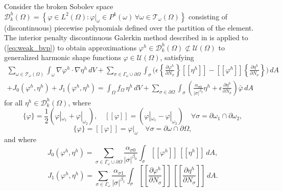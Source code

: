 	Consider the broken Sobolev space $\mathcal{D}^h_k (\Omega) = \left\{ \varphi \in L^2 (\Omega) : \varphi|_{\omega} \in P^k (\omega) \, \forall \omega \in \mathcal{T}_\omega (\Omega) \right\}$ consisting of (discontinuous) piecewise polynomials defined over the partition of the element. The interior penalty discontinuous Galerkin method described in \cite{Riviere:08} is applied to (\ref{eq:weak_bvp}) to obtain approximations $\varphi^h \in \mathcal{D}^h_k (\Omega) \not\subset \mathcal{U} (\Omega)$ to generalized harmonic shape functions $\varphi \in \mathcal{U} (\Omega)$, satisfying
	\begin{eqnarray}
		\sum_{\omega \in \mathcal{T}_\omega (\Omega)} \int_{\omega} \nabla \varphi^h \cdot \nabla \eta^h \, dV + \sum_{\sigma \in \Gamma_\omega \cup \partial \Omega} \int_{\sigma} \bigg( \epsilon \left\{ \frac{\partial \varphi^h}{\partial N_{\sigma}} \right\} [\![ \eta^h ]\!] - [\![ \varphi^h ]\!] \left\{ \frac{\partial \eta^h}{\partial N_{\sigma}} \right\}  \bigg) \, dA \nonumber \\ + J_0 (\varphi^h,\eta^h) + J_1 (\varphi^h,\eta^h) = \int_{\Omega} f_{\Omega} \, \eta^h \, dV + \sum_{\sigma \in \partial \Omega} \int_{\sigma} \left(\frac{\alpha_{\sigma0}}{|\sigma|^{\beta_0}} \eta^h + \epsilon \frac{\partial \eta^h}{\partial N_{\sigma}} \right) \bar{\varphi} \, dA
		\label{eq:dg_poisson}
	\end{eqnarray}
	for all $\eta^h \in \mathcal{D}^h_k (\Omega)$, where
	\begin{equation}
		\{ \varphi \} = \frac{1}{2} (\varphi|_{\omega_1} + \varphi|_{\omega_2}), \quad [\![ \varphi ]\!] = (\varphi|_{\omega_1} - \varphi|_{\omega_2}) \quad \forall \sigma = \partial \omega_1 \cap \partial \omega_2,
	\end{equation}
	\begin{equation}
		\{ \varphi \} = [\![ \varphi ]\!] = \varphi|_{\omega} \quad \forall \sigma = \partial \omega \cap \partial \Omega,
	\end{equation}
	and where
	\begin{equation}
		J_0 (\varphi^h,\eta^h) = \sum_{\sigma \in \Gamma_\omega \cup \partial \Omega} \frac{\alpha_{\sigma0}}{|\sigma|^{\beta_0}} \int_{\sigma} [\![ \varphi^h ]\!] \, [\![ \eta^h ]\!] \, dA,
	\end{equation}
	\begin{equation}
		J_1 (\varphi^h,\eta^h) = \sum_{\sigma \in \Gamma_\omega} \frac{\alpha_{\sigma1}}{|\sigma|^{\beta_1}} \int_{\sigma} \left[\!\!\left[ \frac{\partial \varphi^h}{\partial N_{\sigma}} \right]\!\!\right] \, \left[\!\!\left[ \frac{\partial \eta^h}{\partial N_{\sigma}} \right]\!\!\right] \, dA.
	\end{equation}
